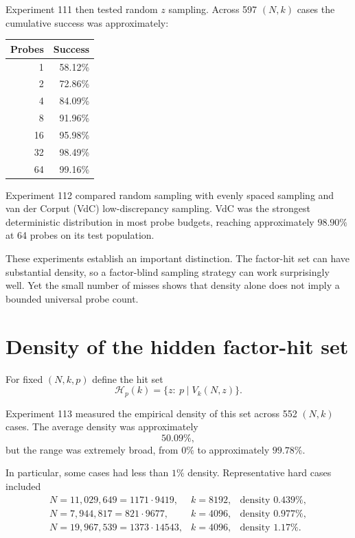 \documentclass[11pt,a4paper]{article}
\begin{document}
Experiment 111 then tested random $z$ sampling. Across 597 $(N,k)$ cases the cumulative success was approximately:
\begin{center}
\begin{tabular}{rr}
\toprule
Probes & Success \\
\midrule
1 & 58.12\% \\
2 & 72.86\% \\
4 & 84.09\% \\
8 & 91.96\% \\
16 & 95.98\% \\
32 & 98.49\% \\
64 & 99.16\% \\
\bottomrule
\end{tabular}
\end{center}

Experiment 112 compared random sampling with evenly spaced sampling and van der Corput (VdC) low-discrepancy sampling. VdC was the strongest deterministic distribution in most probe budgets, reaching approximately $98.90\%$ at 64 probes on its test population.

These experiments establish an important distinction. The factor-hit set can have substantial density, so a factor-blind sampling strategy can work surprisingly well. Yet the small number of misses shows that density alone does not imply a bounded universal probe count.

\section{Density of the hidden factor-hit set}
\label{sec:density}

For fixed $(N,k,p)$ define the hit set
\begin{equation}
\mathcal H_p(k)=
\{z:\ p\mid V_k(N,z)\}.
\end{equation}

Experiment 113 measured the empirical density of this set across 552 $(N,k)$ cases. The average density was approximately
\[
50.09\%,
\]
but the range was extremely broad, from $0\%$ to approximately $99.78\%$.

In particular, some cases had less than $1\%$ density. Representative hard cases included
\[
\begin{array}{lll}
N=11{,}029{,}649=1171\cdot9419,&k=8192,&\text{density }0.439\%,\\
N=7{,}944{,}817=821\cdot9677,&k=4096,&\text{density }0.977\%,\\
N=19{,}967{,}539=1373\cdot14543,&k=4096,&\text{density }1.17\%.
\end{array}
\]
\end{document}
